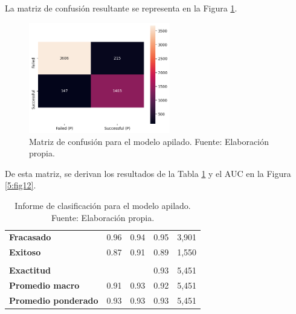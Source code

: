 La matriz de confusión resultante se representa en la Figura \ref{5:fig11}.
\begin{figure}[!ht]
	\begin{center}
		\includegraphics[width=0.55\textwidth]{5/figures/stacked_confusion_matrix.png}
		\caption{Matriz de confusión para el modelo apilado. Fuente: Elaboración propia.}
		\label{5:fig11}
	\end{center}
\end{figure}

De esta matriz, se derivan los resultados de la Tabla \ref{5:table4} y el AUC en la Figura \ref{5:fig12}.

\begin{table}[h!]
	\centering
	\small
	\begin{tabular}{ |m{4.5cm}|m{2.5cm}|m{2.5cm}|m{2.5cm}|m{2.5cm}|  }
		\hline
		\rowcolor{bluejean}
		\Centering \color{white}{Valor}& \Centering \color{white}{Precisión}& \Centering \color{white}{Sensibilidad}& \Centering \color{white}{Puntaje F1}& \Centering \color{white}{Muestras}\\
		\hline
		\textbf{Fracasado} & 0.96 & 0.94 & 0.95 & 3,901 \\
		\hline
		\textbf{Exitoso} & 0.87 & 0.91 & 0.89 & 1,550 \\
		\hline
		\rowcolor{turq}
		\multicolumn{5}{c}{ } \\
		\hline
		\textbf{Exactitud} &  &	 & 0.93 & 5,451 \\
		\hline
		\textbf{Promedio macro} & 0.91 & 0.93 & 0.92 & 5,451 \\
		\hline
		\textbf{Promedio ponderado} & 0.93 & 0.93 & 0.93 & 5,451 \\
		\hline
	\end{tabular}
	\caption{Informe de clasificación para el modelo apilado. Fuente: Elaboración propia.}
	\label{5:table4}
\end{table}

